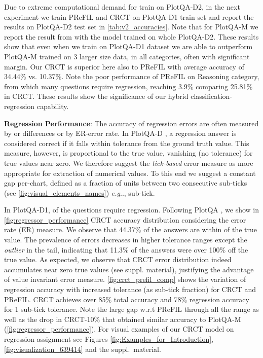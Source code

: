 \documentclass[runningheads]{llncs}
\makeatletter
\DeclareRobustCommand\onedot{\futurelet\@let@token\@onedot}
\def\@onedot{\ifx\@let@token.\else.\null\fi\xspace}
\def\eg{\emph{e.g}\onedot} \def\Eg{\emph{E.g}\onedot}
\makeatother
\begin{document}
Due to extreme computational demand for train on PlotQA-D2, in the next experiment we train PReFIL and CRCT on PlotQA-D1 train set and report the results on PlotQA-D2 test set in \cref{tab:v2_accuracies}. Note that for PlotQA-M we report the result from \cite{plotqa} with the model trained on whole PlotQA-D2. 
These results show that even when we train on PlotQA-D1 dataset we are able to outperform PlotQA-M trained on 3 larger size data, in all categories, often with significant margin. Our CRCT is superior here also to PReFIL with average accuracy of 34.44\% vs. 10.37\%. Note the poor performance of PReFIL on Reasoning category, from which many questions require regression, reaching 3.9\% comparing 25.81\% in CRCT. These results show the significance of our hybrid classification-regression capability.


{\bf Regression Performance}: 
The accuracy of regression errors are often measured by  or  differences or by ER-error rate. 
In PlotQA-D \cite{plotqa}, a regression answer is considered correct if it falls within  tolerance from the ground truth value.
This measure, however, is proportional to the true value, vanishing (no tolerance) for true values near zero. We therefore suggest the \emph{tick-based} error measure as more appropriate for extraction of numerical values. To this end we suggest a constant gap per-chart, defined as a fraction of units between two consecutive sub-ticks (see \cref{fig:visual_elements_names}) \eg,  sub-tick.

In PlotQA-D1,  of the questions require regression. Following PlotQA \cite{plotqa}, we show in \cref{fig:regressor_performance} CRCT accuracy distribution considering the error rate (ER) measure.
We observe that 44.37\% of the answers are within  of the true value. The prevalence of errors decreases in higher tolerance ranges except the {\it outlier} in the tail, indicating that 11.3\% of the answers were over 100\% off the true value. As expected, we observe that CRCT error distribution indeed accumulates near zero true values (see suppl. material), justifying the advantage of value invariant error measure. \cref{fig:crct_prefil_comp} shows the variation of regression accuracy with increased tolerance (as sub-tick fraction) for CRCT and PReFIL. CRCT achieves over 85\% total accuracy and 78\% regression accuracy for 1 sub-tick tolerance. Note the large gap w.r.t PReFIL through all the range as well as the drop in CRCT-10\% that obtained similar accuracy to PlotQA-M (\cref{fig:regressor_performance}).
For visual examples of our CRCT model on regression assignment see Figures \ref{fig:Examples_for_Introduction}, \ref{fig:visualization_639414} and the suppl.~material.
\end{document}
